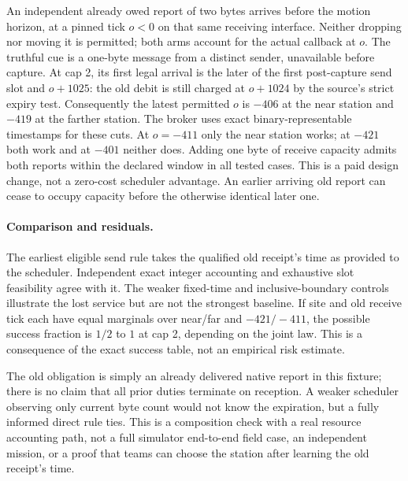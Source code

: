 \documentclass{article}
\begin{document}
An independent already owed report of two bytes arrives before the
motion horizon, at a pinned tick $o<0$ on that same receiving
interface. Neither dropping nor moving it is permitted; both arms
account for the actual callback at $o$. The truthful cue is a
one-byte message from a distinct sender, unavailable before capture.
At cap 2, its first legal arrival is the later of the first
post-capture send slot and $o+1025$: the old debit is still charged
at $o+1024$ by the source's strict expiry test. Consequently the
latest permitted $o$ is $-406$ at the near station and $-419$ at
the farther station. The broker uses exact binary-representable
timestamps for these cuts. At $o=-411$ only the near station works;
at $-421$ both work and at $-401$ neither does. Adding one byte of
receive capacity admits both reports within the declared window in
all tested cases. This is a paid design change, not a zero-cost
scheduler advantage. An earlier arriving old report can cease to
occupy capacity before the otherwise identical later one.

\paragraph{Comparison and residuals.}
The earliest eligible send rule takes the qualified old receipt's
time as provided to the scheduler. Independent exact integer
accounting and exhaustive slot feasibility agree with it.
The weaker fixed-time and inclusive-boundary controls illustrate
the lost service but are not the strongest baseline. If site and
old receive tick each have equal marginals over near/far and
$-421/-411$, the possible success fraction is $1/2$ to $1$ at
cap 2, depending on the joint law. This is a consequence of the
exact success table, not an empirical risk estimate.

The old obligation is simply an already delivered native report
in this fixture; there is no claim that all prior duties terminate
on reception. A weaker scheduler observing only current byte count
would not know the expiration, but a fully informed direct rule
ties. This is a composition check with a real resource accounting
path, not a full simulator end-to-end field case, an independent
mission, or a proof that teams can choose the station after learning
the old receipt's time.
\end{document}
